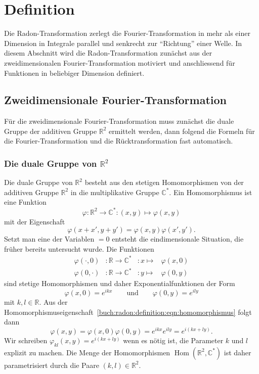%
%
%
\section{Definition
\label{buch:radon:section:definition}}
Die Radon-Transformation zerlegt die Fourier-Transformation in 
mehr als einer Dimension in Integrale parallel und senkrecht
zur ``Richtung'' einer Welle.
In diesem Abschnitt wird die Radon-Transformation zunächst aus der
zweidimensionalen Fourier-Transformation motiviert und anschliessend
für Funktionen in beliebiger Dimension definiert.

%
%
\subsection{Zweidimensionale Fourier-Transformation
\label{buch:radon:definition:subsection:2dfourier}}
Für die zweidimensionale Fourier-Transformation muss zunächst die
duale Gruppe der additiven Gruppe $\mathbb{R}^2$ ermittelt werden,
dann folgend die Formeln für die Fourier-Transformation und die
Rücktransformation fast automatisch.

%
%
\subsubsection{Die duale Gruppe von $\mathbb{R}^2$}
Die duale Gruppe von $\mathbb{R}^2$ besteht aus den stetigen
Homomorphismen von der additiven Gruppe $\mathbb{R}^2$ in die
multiplikative Gruppe $\mathbb{C}^*$.
Ein Homomorphismus ist eine Funktion
\[
\varphi
\colon
\mathbb{R}^2\to\mathbb{C}^*
:
(x,y)\mapsto \varphi(x,y)
\]
mit der Eigenschaft
\begin{equation}
\varphi(x+x',y+y')
=
\varphi(x,y)
\varphi(x',y').
\label{buch:radon:definition:eqn:homomorphismus}
\end{equation}
Setzt man eine der Variablen $=0$ entsteht die eindimensionale Situation,
die früher bereits untersucht wurde.
Die Funktionen
\begin{equation*}
\begin{aligned}
\varphi(\cdot,0)&\colon \mathbb{R} \to \mathbb{C}^*&:
x\mapsto &\varphi(x,0)
\\
\varphi(0,\cdot)&\colon \mathbb{R} \to \mathbb{C}^*&:
y\mapsto &\varphi(0,y)
\end{aligned}
\end{equation*}
sind stetige Homomorphismen und daher Exponentialfunktionen der Form
\[
\varphi(x,0) = e^{ikx}
\qquad\text{und}\qquad
\varphi(0,y) = e^{ily}
\]
mit $k,l\in\mathbb{R}$.
Aus der
Homomorphismuseigenschaft~\eqref{buch:radon:definition:eqn:homomorphismus}
folgt dann
\[
\varphi(x,y)
=
\varphi(x,0)\varphi(0,y)
=
e^{ikx}e^{ily}
=
e^{i(kx+ly)}.
\]
Wir schreiben $\varphi_{kl}(x,y) = e^{i(kx+ly)}$ wenn es nötig ist, die
Parameter $k$ und $l$ explizit zu machen.
Die Menge der Homomorphismen $\operatorname{Hom}(\mathbb{R}^2,\mathbb{C}^*)$
ist daher parametrisiert durch die Paare $(k,l)\in\mathbb{R}^2$.

